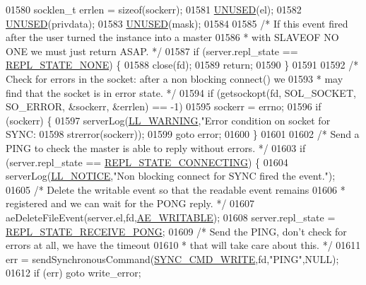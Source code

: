 \begin{DoxyCode}
{{{{{{{{{{{{{{{{{{{{{{{{{{{{{{{{{{{{{{{{{{{{{{{{{{{{{{{{{{01580     socklen\_t errlen = \textcolor{keyword}{sizeof}(sockerr);
01581     \hyperlink{server_8h_ae7c9dc8f13568a9c856573751f1ee1ec}{UNUSED}(el);
01582     \hyperlink{server_8h_ae7c9dc8f13568a9c856573751f1ee1ec}{UNUSED}(privdata);
01583     \hyperlink{server_8h_ae7c9dc8f13568a9c856573751f1ee1ec}{UNUSED}(mask);
01584 
01585     \textcolor{comment}{/* If this event fired after the user turned the instance into a master}
01586 \textcolor{comment}{     * with SLAVEOF NO ONE we must just return ASAP. */}
01587     \textcolor{keywordflow}{if} (server.repl\_state == \hyperlink{server_8h_a256b9506e551eaa7417f75f8fa9ed901}{REPL\_STATE\_NONE}) \{
01588         close(fd);
01589         \textcolor{keywordflow}{return};
01590     \}
01591 
01592     \textcolor{comment}{/* Check for errors in the socket: after a non blocking connect() we}
01593 \textcolor{comment}{     * may find that the socket is in error state. */}
01594     \textcolor{keywordflow}{if} (getsockopt(fd, SOL\_SOCKET, SO\_ERROR, &sockerr, &errlen) == -1)
01595         sockerr = errno;
01596     \textcolor{keywordflow}{if} (sockerr) \{
01597         serverLog(\hyperlink{server_8h_a31229b9334bba7d6be2a72970967a14b}{LL\_WARNING},\textcolor{stringliteral}{"Error condition on socket for SYNC: %
01598             strerror(sockerr));
01599         \textcolor{keywordflow}{goto} error;
01600     \}
01601 
01602     \textcolor{comment}{/* Send a PING to check the master is able to reply without errors. */}
01603     \textcolor{keywordflow}{if} (server.repl\_state == \hyperlink{server_8h_a5fd7ad86a4a65d6486d151151a59e9a5}{REPL\_STATE\_CONNECTING}) \{
01604         serverLog(\hyperlink{server_8h_a8c54c191e436c7dd3012167212692401}{LL\_NOTICE},\textcolor{stringliteral}{"Non blocking connect for SYNC fired the event."});
01605         \textcolor{comment}{/* Delete the writable event so that the readable event remains}
01606 \textcolor{comment}{         * registered and we can wait for the PONG reply. */}
01607         aeDeleteFileEvent(server.el,fd,\hyperlink{ae_8h_ab6bfb0366ccb6277112d132c2a2bf500}{AE\_WRITABLE});
01608         server.repl\_state = \hyperlink{server_8h_a61922e0fcf35df9722d2648484d23ff2}{REPL\_STATE\_RECEIVE\_PONG};
01609         \textcolor{comment}{/* Send the PING, don't check for errors at all, we have the timeout}
01610 \textcolor{comment}{         * that will take care about this. */}
01611         err = sendSynchronousCommand(\hyperlink{replication_8c_aa4480c458f209657b59d476157d44aab}{SYNC\_CMD\_WRITE},fd,\textcolor{stringliteral}{"PING"},NULL);
01612         \textcolor{keywordflow}{if} (err) \textcolor{keywordflow}{goto} write\_error;
}}}}}}}}}}}}}}}}}}}}}}}}}}}}}}}}}}}}}}}}}}}}}}}}}}}}}}}}}}}
\end{DoxyCode}
